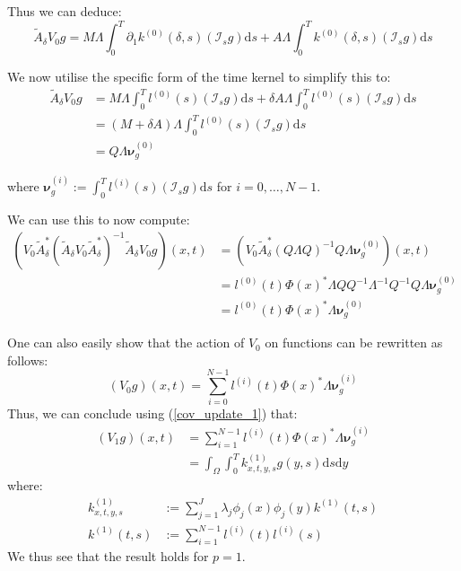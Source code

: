 \documentclass{article}
\theoremstyle{definition}
\theoremstyle{remark}
\theoremstyle{remark}
\begin{document}
\noindent Thus we can deduce:
\begin{equation}
    \tilde{A}_{\delta}V_{0}g=M\Lambda\int_{0}^{T}\partial_{1}k^{(0)}(\delta,s)(\mathcal{I}_{s}g)\mathrm{d}s + A\Lambda\int_{0}^{T}k^{(0)}(\delta,s)(\mathcal{I}_{s}g)\mathrm{d}s
\end{equation}

\noindent We now utilise the specific form of the time kernel to simplify this to:
\begin{align}
    \tilde{A}_{\delta}V_{0}g &= M\Lambda\int_{0}^{T}l^{(0)}(s)(\mathcal{I}_{s}g)\mathrm{d}s + \delta A\Lambda\int_{0}^{T}l^{(0)}(s)(\mathcal{I}_{s}g)\mathrm{d}s \\
    &= (M+\delta A)\Lambda\int_{0}^{T}l^{(0)}(s)(\mathcal{I}_{s}g)\mathrm{d}s \\
    &= Q\Lambda\boldsymbol{\nu}_{g}^{(0)}
\end{align}

where $\boldsymbol{\nu}_{g}^{(i)}:=\int_{0}^{T}l^{(i)}(s)(\mathcal{I}_{s}g)\mathrm{d}s$ for $i=0,\dots,N-1$.

\noindent We can use this to now compute:
\begin{align*}
    (V_{0}\tilde{A}_{\delta}^{*}(\tilde{A}_{\delta}V_{0}\tilde{A}_{\delta}^{*})^{-1}\tilde{A}_{\delta}V_{0}g)(x,t) &=
    (V_{0}\tilde{A}_{\delta}^{*}(Q\Lambda Q)^{-1}Q\Lambda\boldsymbol{\nu}_{g}^{(0)})(x,t) \\
    &=l^{(0)}(t)\Phi(x)^{*}\Lambda Q Q^{-1}\Lambda^{-1}Q^{-1}Q\Lambda\boldsymbol{\nu}_{g}^{(0)} \\
    &=l^{(0)}(t)\Phi(x)^{*}\Lambda\boldsymbol{\nu}_{g}^{(0)}
\end{align*}

\noindent One can also easily show that the action of $V_{0}$ on functions can be rewritten as follows:
\begin{equation}
    (V_{0}g)(x,t) = \sum_{i=0}^{N-1}l^{(i)}(t)\Phi(x)^{*}\Lambda\boldsymbol{\nu}_{g}^{(i)}
\end{equation}
Thus, we can conclude using (\ref{cov_update_1}) that:
\begin{align}
    (V_{1}g)(x,t) &= \sum_{i=1}^{N-1}l^{(i)}(t)\Phi(x)^{*}\Lambda\boldsymbol{\nu}_{g}^{(i)} \nonumber \\
    &=\int_{\Omega}\int_{0}^{T}k^{(1)}_{x,t,y,s}g(y,s)\mathrm{d}s\mathrm{d}y
\end{align}
where:
\begin{align}
    k^{(1)}_{x,t,y,s} &:= \sum_{j=1}^{J}\lambda_{j}\phi_{j}(x)\phi_{j}(y)k^{(1)}(t,s) \\
    k^{(1)}(t,s) &:= \sum_{i=1}^{N-1}l^{(i)}(t)l^{(i)}(s)
\end{align}
We thus see that the result holds for $p=1$.
\end{document}
